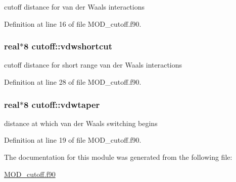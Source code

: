 cutoff distance for van der Waals interactions 



Definition at line 16 of file M\-O\-D\-\_\-cutoff.\-f90.

\hypertarget{classcutoff_abf62f41b2e876715123765edd145d64b}{
\subsubsection[{vdwshortcut}]{\setlength{\rightskip}{0pt plus 5cm}real$\ast$8 cutoff\-::vdwshortcut}}\label{classcutoff_abf62f41b2e876715123765edd145d64b}


cutoff distance for short range van der Waals interactions 



Definition at line 28 of file M\-O\-D\-\_\-cutoff.\-f90.

\hypertarget{classcutoff_a807a24c28103ec7547be8bd3b5ec9314}{
\subsubsection[{vdwtaper}]{\setlength{\rightskip}{0pt plus 5cm}real$\ast$8 cutoff\-::vdwtaper}}\label{classcutoff_a807a24c28103ec7547be8bd3b5ec9314}


distance at which van der Waals switching begins 



Definition at line 19 of file M\-O\-D\-\_\-cutoff.\-f90.



The documentation for this module was generated from the following file\-:\begin{DoxyCompactItemize}
\item 
\hyperlink{MOD__cutoff_8f90}{M\-O\-D\-\_\-cutoff.\-f90}\end{DoxyCompactItemize}

